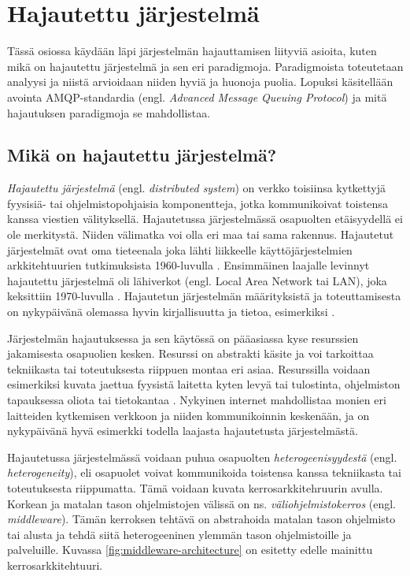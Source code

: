 \chapter{Hajautettu järjestelmä}
\label{ch:distributed-systems}
Tässä osiossa käydään läpi järjestelmän hajauttamisen liityviä asioita, kuten mikä on hajautettu järjestelmä ja sen eri paradigmoja. Paradigmoista toteutetaan analyysi ja niistä arvioidaan niiden hyviä ja huonoja puolia. Lopuksi käsitellään avointa AMQP-standardia (engl. \emph{Advanced Message Queuing Protocol}) ja mitä hajautuksen paradigmoja se mahdollistaa.


\section{Mikä on hajautettu järjestelmä?}
\emph{Hajautettu järjestelmä} (engl. \emph{distributed system}) on verkko toisiinsa kytkettyjä fyysisiä- tai ohjelmistopohjaisia komponentteja, jotka kommunikoivat toistensa kanssa viestien välityksellä. Hajautetussa järjestelmässä osapuolten etäisyydellä ei ole merkitystä. Niiden välimatka voi olla eri maa tai sama rakennus. Hajautetut järjestelmät ovat oma tieteenala joka lähti liikkeelle käyttöjärjestelmien arkkitehtuurien tutkimuksista 1960-luvulla \cite[s.~384]{andrews2000foundations}. Ensimmäinen laajalle levinnyt hajautettu järjestelmä oli lähiverkot (engl. Local Area Network tai LAN), joka keksittiin 1970-luvulla \cite[s.~32]{andrews2000foundations}. Hajautetun järjestelmän määrityksistä ja toteuttamisesta on nykypäivänä olemassa hyvin kirjallisuutta ja tietoa, esimerkiksi \cite{distributed-systems-concepts-and-design, distributed-event-based-systems, mullender1993distributed, baldoni2005distributed}.

Järjestelmän hajautuksessa ja sen käytössä on pääasiassa kyse resurssien jakamisesta osapuolien kesken. Resurssi on abstrakti käsite ja voi tarkoittaa tekniikasta tai toteutuksesta riippuen montaa eri asiaa. Resurssilla voidaan esimerkiksi kuvata jaettua fyysistä laitetta kyten levyä tai tulostinta, ohjelmiston tapauksessa oliota tai tietokantaa \cite[s.~2--3]{distributed-systems-concepts-and-design}. Nykyinen internet mahdollistaa monien eri laitteiden kytkemisen verkkoon ja niiden kommunikoinnin keskenään, ja on nykypäivänä hyvä esimerkki todella laajasta hajautetusta järjestelmästä.

Hajautetussa järjestelmässä voidaan puhua osapuolten \emph{heterogeenisyydestä} (engl. \emph{heterogeneity}), eli osapuolet voivat kommunikoida toistensa kanssa tekniikasta tai toteutuksesta riippumatta. Tämä voidaan kuvata kerrosarkkitehruurin avulla. Korkean ja matalan tason ohjelmistojen välissä on ns. \emph{väliohjelmistokerros} (engl. \emph{middleware}). Tämän kerroksen tehtävä on abstrahoida matalan tason ohjelmisto tai alusta ja tehdä siitä heterogeeninen ylemmän tason ohjelmistoille ja palveluille. Kuvassa \ref{fig:middleware-architecture} on esitetty edelle mainittu kerrosarkkitehtuuri. \mbox{\cite[s. ~16--17]{distributed-systems-concepts-and-design}} \mbox{\cite[s.~2--3]{distributed-event-based-systems}}


